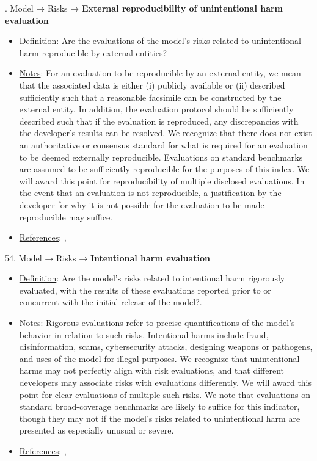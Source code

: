 . Model → Risks → \textbf{External reproducibility of unintentional harm evaluation}
\vspace{-\parskip}
\begin{itemize}
	\item
	\underline{Definition}: Are the evaluations of the model’s risks related to unintentional harm reproducible by external entities?
	\item
	\underline{Notes}: For an evaluation to be reproducible by an external entity, we mean that the associated data is either (i) publicly available or (ii) described sufficiently such that a reasonable facsimile can be constructed by the external entity. In addition, the evaluation protocol should be sufficiently described such that if the evaluation is reproduced, any discrepancies with the developer's results can be resolved. We recognize that there does not exist an authoritative or consensus standard for what is required for an evaluation to be deemed externally reproducible. Evaluations on standard benchmarks are assumed to be sufficiently reproducible for the purposes of this index. We will award this point for reproducibility of multiple disclosed evaluations. In the event that an evaluation is not reproducible, a justification by the developer for why it is not possible for the evaluation to be made reproducible may suffice.
	\item
	\underline{References}: \citet{kapoor2023leakage}, \citet{weidinger2021ethical}
\end{itemize} \vspace{\baselineskip}


54. Model → Risks → \textbf{Intentional harm evaluation}
\vspace{-\parskip}
\begin{itemize}
	\item
	\underline{Definition}: Are the model’s risks related to intentional harm rigorously evaluated, with the results of these evaluations reported prior to or concurrent with the initial release of the model?.
	\item
	\underline{Notes}: Rigorous evaluations refer to precise quantifications of the model's behavior in relation to such risks. Intentional harms include fraud, disinformation, scams, cybersecurity attacks, designing weapons or pathogens, and uses of the model for illegal purposes. We recognize that unintentional harms may not perfectly align with risk evaluations, and that different developers may associate risks with evaluations differently. We will award this point for clear evaluations of multiple such risks. We note that evaluations on standard broad-coverage benchmarks are likely to suffice for this indicator, though they may not if the model's risks related to unintentional harm are presented as especially unusual or severe.
	\item
	\underline{References}: \citet{solaiman2023evaluating}, \citet{weidinger2021ethical}
\end{itemize} \vspace{\baselineskip}


